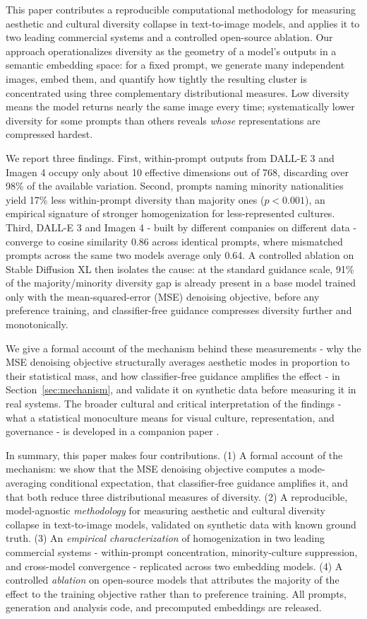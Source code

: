 \documentclass[11pt]{article}
\begin{document}
This paper contributes a reproducible computational methodology for measuring aesthetic and cultural diversity collapse in text-to-image models, and applies it to two leading commercial systems and a controlled open-source ablation. Our approach operationalizes diversity as the geometry of a model's outputs in a semantic embedding space: for a fixed prompt, we generate many independent images, embed them, and quantify how tightly the resulting cluster is concentrated using three complementary distributional measures. Low diversity means the model returns nearly the same image every time; systematically lower diversity for some prompts than others reveals \emph{whose} representations are compressed hardest.

We report three findings. First, within-prompt outputs from DALL-E 3 and Imagen 4 occupy only about 10 effective dimensions out of 768, discarding over 98\% of the available variation. Second, prompts naming minority nationalities yield 17\% less within-prompt diversity than majority ones ($p < 0.001$), an empirical signature of stronger homogenization for less-represented cultures. Third, DALL-E 3 and Imagen 4 - built by different companies on different data - converge to cosine similarity 0.86 across identical prompts, where mismatched prompts across the same two models average only 0.64. A controlled ablation on Stable Diffusion XL then isolates the cause: at the standard guidance scale, 91\% of the majority/minority diversity gap is already present in a base model trained only with the mean-squared-error (MSE) denoising objective, before any preference training, and classifier-free guidance compresses diversity further and monotonically.

We give a formal account of the mechanism behind these measurements - why the MSE denoising objective structurally averages aesthetic modes in proportion to their statistical mass, and how classifier-free guidance amplifies the effect - in Section~\ref{sec:mechanism}, and validate it on synthetic data before measuring it in real systems. The broader cultural and critical interpretation of the findings - what a statistical monoculture means for visual culture, representation, and governance - is developed in a companion paper \citep{Companion2026}.

In summary, this paper makes four contributions. (1) A formal account of the mechanism: we show that the MSE denoising objective computes a mode-averaging conditional expectation, that classifier-free guidance amplifies it, and that both reduce three distributional measures of diversity. (2) A reproducible, model-agnostic \emph{methodology} for measuring aesthetic and cultural diversity collapse in text-to-image models, validated on synthetic data with known ground truth. (3) An \emph{empirical characterization} of homogenization in two leading commercial systems - within-prompt concentration, minority-culture suppression, and cross-model convergence - replicated across two embedding models. (4) A controlled \emph{ablation} on open-source models that attributes the majority of the effect to the training objective rather than to preference training. All prompts, generation and analysis code, and precomputed embeddings are released.
\end{document}
